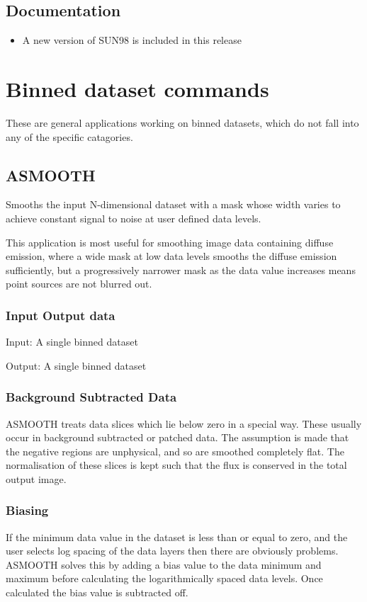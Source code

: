 \documentclass{book}
\renewcommand{\_}{{\tt\char'137}}     %
\begin{document}
\section{Documentation}
\begin{itemize}
\item A new version of SUN98 is included in this release
\end{itemize}
\chapter{Binned dataset commands}
These are general applications working on binned datasets, which
do not fall into any of the specific catagories.
 
\section{ASMOOTH}
Smooths the input N-dimensional dataset with a mask whose width
varies to achieve constant signal to noise at user defined data
levels.
 
This application is most useful for smoothing image data containing
diffuse emission, where a wide mask at low data levels smooths the
diffuse emission sufficiently, but a progressively narrower mask
as the data value increases means point sources are not blurred out.
 
\subsection{Input Output data}
Input: A single binned dataset
 
Output: A single binned dataset
 
\subsection{Background Subtracted Data}
ASMOOTH treats data slices which lie below zero in a special way.
These usually occur in background subtracted or patched data. The
assumption is made that the negative regions are unphysical, and
so are smoothed completely flat. The normalisation of these slices
is kept such that the flux is conserved in the total output image.
 
\subsection{Biasing}
If the minimum data value in the dataset is less than or equal to
zero, and the user selects log spacing of the data layers then
there are obviously problems. ASMOOTH solves this by adding a bias
value to the data minimum and maximum before calculating the
logarithmically spaced data levels. Once calculated the bias value
is subtracted off.
 
\end{document}
